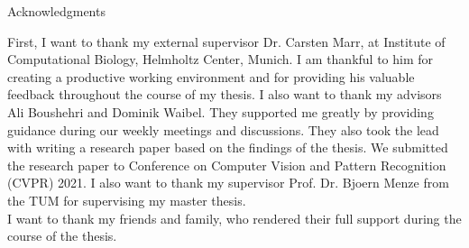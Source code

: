 \thispagestyle{empty}


{ Acknowledgments}

\vspace{10mm}

First, I want to thank my external supervisor Dr. Carsten Marr, at Institute of Computational Biology, Helmholtz Center, Munich. I am thankful to him for creating a productive working environment and for providing his valuable feedback throughout the course of my thesis. I also want to thank my advisors Ali Boushehri and Dominik Waibel. They supported me greatly by providing guidance during our weekly meetings and discussions. They also took the lead with writing a research paper based on the findings of the thesis. We submitted the research paper to Conference on Computer Vision and Pattern Recognition (CVPR) 2021. I also want to thank my supervisor Prof. Dr. Bjoern Menze from the TUM for supervising my master thesis. \\
I want to thank my friends and family, who rendered their full support during the course of the thesis.

\cleardoublepage{}
